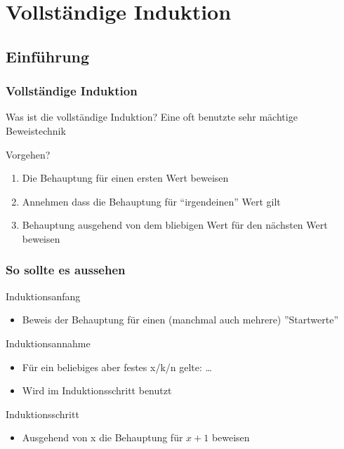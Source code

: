 \documentclass{beamer}
\begin{document}
\section{Vollst\"andige Induktion}
\subsection[Einf\"uhrung]{Einf\"uhrung}
\begin{frame}
	\frametitle{Vollständige Induktion}
	\begin{block}{Was ist die vollst\"andige Induktion?}
		Eine oft benutzte sehr m\"achtige Beweistechnik
	\end{block}
	\begin{block}{Vorgehen?}
		\begin{enumerate}
			\item Die Behauptung f\"ur einen ersten Wert beweisen
			\item Annehmen dass die Behauptung f\"ur ``irgendeinen'' Wert gilt
			\item Behauptung ausgehend von dem bliebigen Wert f\"ur den n\"achsten 			Wert beweisen
		\end{enumerate}
	\end{block}
\end{frame}

\begin{frame}
	\frametitle{So sollte es aussehen}
	\begin{block}{Induktionsanfang}
		\begin{itemize}
			\item Beweis der Behauptung für einen (manchmal auch mehrere) 						''Startwerte''
		\end{itemize}
	\end{block}
	\pause
	\begin{block}{Induktionsannahme}
		\begin{itemize}
			\item F\"ur ein beliebiges aber festes x/k/n gelte: \ldots
			\item Wird im Induktionsschritt benutzt
		\end{itemize}
	\end{block}
	\pause
	\begin{block}{Induktionsschritt}
		\begin{itemize}
			\item Ausgehend von x die Behauptung f\"ur $x + 1$ beweisen
		\end{itemize}
	\end{block}
\end{frame}
\end{document}
